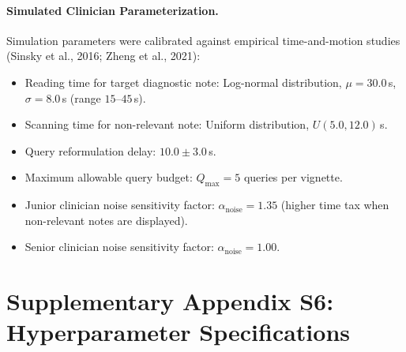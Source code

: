 \documentclass[11pt]{article}
\begin{document}
\paragraph{Simulated Clinician Parameterization.}
Simulation parameters were calibrated against empirical time-and-motion studies (Sinsky et al., 2016; Zheng et al., 2021):
\begin{itemize}
  \item Reading time for target diagnostic note: Log-normal distribution, $\mu = 30.0$\,s, $\sigma = 8.0$\,s (range $15$--$45$\,s).
  \item Scanning time for non-relevant note: Uniform distribution, $U(5.0, 12.0)$\,s.
  \item Query reformulation delay: $10.0 \pm 3.0$\,s.
  \item Maximum allowable query budget: $Q_{\max} = 5$ queries per vignette.
  \item Junior clinician noise sensitivity factor: $\alpha_{\text{noise}} = 1.35$ (higher time tax when non-relevant notes are displayed).
  \item Senior clinician noise sensitivity factor: $\alpha_{\text{noise}} = 1.00$.
\end{itemize}

\section{Supplementary Appendix S6: Hyperparameter Specifications}
\end{document}
